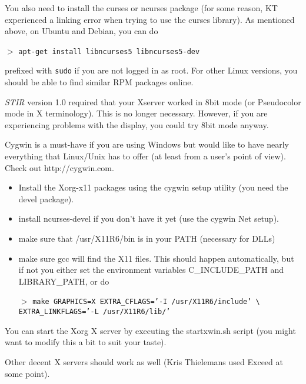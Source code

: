 \documentclass{article}
\newcommand{\cmdline}[1]{\par \noindent $>$ \texttt{#1}\par}
\begin{document}
{ 
}

You also need to install the curses or ncurses package (for some reason, KT experienced 
a linking error when trying to use the curses library). As mentioned above, on Ubuntu and
Debian, you can do

\cmdline{apt-get install libncurses5 libncurses5-dev}

prefixed with \texttt{sudo} if you are not logged in as root. For other Linux versions, 
you should be able to find similar RPM packages online.

{ 
}

\textit{STIR} version 1.0 required that your Xserver worked in 8bit 
mode (or Pseudocolor mode in X terminology). This is no longer 
necessary. However, if you are experiencing problems with the 
display, you could try 8bit mode anyway.



{ 
}

Cygwin is a must-have if you are using Windows but would like 
to have nearly everything that Linux/Unix has to offer (at least 
from a user's point of view). Check out http://cygwin.com.

{ 
}
\begin{itemize}
\item Install the Xorg-x11 packages using the cygwin setup utility 
(you need the devel package).
\item 
install ncurses-devel if you don't have it yet (use the cygwin 
Net setup).
\item make sure that /usr/X11R6/bin is in your PATH (necessary 
for DLLs)
\item
make sure gcc will find the X11 files. This should happen automatically, 
but if not you either set the 
environment variables C\_INCLUDE\_PATH and LIBRARY\_PATH, or 
do
\cmdline{make GRAPHICS=X EXTRA\_CFLAGS='-I /usr/X11R6/include' 
{\textbackslash} \\
EXTRA\_LINKFLAGS='-L 
/usr/X11R6/lib/'}
\end{itemize}

You can start the Xorg X server by executing the startxwin.sh 
script (you might want to modify this a bit to suit your taste). 



Other decent X servers should work as well (Kris Thielemans used Exceed at 
some point).
\end{document}
